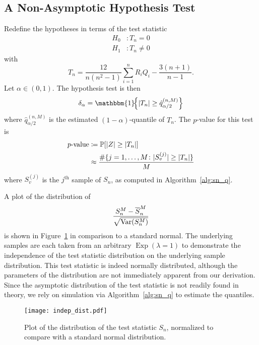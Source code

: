 \documentclass[letterpaper, reqno]{amsart}
\numberwithin{equation}{section}
\newcommand{\Prob}[1]{\mathbb{P}\mleft[#1\mright]}
\newcommand{\Var}[1]{\operatorname{Var}\mleft(#1\mright)}
\newcommand{\indic}[1]{\mathbbm{1}\!\mleft\{#1\mright\}} %
\newcommand{\sumi}[2]{\sum_{#1=1}^{#2}}
\begin{document}
\subsection{A Non-Asymptotic Hypothesis Test}
Redefine the hypotheses in terms of the test statistic
\begin{align*}
  H_0 &\colon T_n = 0 \\
  H_1 &\colon T_n \ne 0
\end{align*}
with
\[ T_n = \frac{12}{n(n^2 - 1)} \sumi{i}{n}R_iQ_i - \frac{3(n+1)}{n-1}. \]
Let $\alpha \in (0, 1)$. The hypothesis test is then
\[ \delta_\alpha = \indic{|T_n| \ge \hat{q}_{\alpha/2}^{(n, M)}} \]
where $\hat{q}_{\alpha/2}^{(n, M)}$ is the estimated $(1 - \alpha)$-quantile
of $T_n$. The $p$-value for this test is
\begin{align*}
  \text{$p$-value} &\coloneqq \Prob{|Z| \ge |T_n|} \\
  &\approx \frac{\#\{j=1,\dots,M \colon |S_v^{(j)}| \ge |T_n|\}}{M}
\end{align*}
where $S_v^{(j)}$ is the $j^{\text{th}}$ sample of $S_n$, as computed in
Algorithm~\ref{alg:sn_q}.

A plot of the distribution of
\[ \frac{S_n^M - \overline{S}_n^M}{\sqrt{\Var{S_n^M}}} \]
is shown in Figure~\ref{fig:Sn} in comparison to a standard normal. The
underlying samples are each taken from an arbitrary
$\operatorname{Exp}(\lambda=1)$ to demonstrate the independence of the test
statistic distribution on the underlying sample distribution. This test
statistic is indeed normally distributed, although the parameters of the
distribution are not immediately apparent from our derivation. Since the
asymptotic distribution of the test statistic is not readily found in theory, we
rely on simulation via Algorithm~\ref{alg:sn_q} to estimate the quantiles.

\begin{figure}[!h]
  \centering
  \texttt{[image: indep\_dist.pdf]}
  \caption{Plot of the distribution of the test statistic $S_n$, normalized to
    compare with a standard normal distribution.}
  \label{fig:Sn}
\end{figure}


% 
\end{document}

